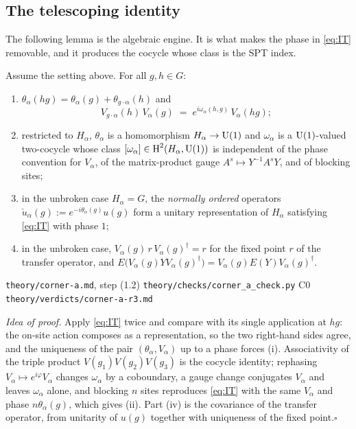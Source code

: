 \subsection{The telescoping identity}

The following lemma is the algebraic engine.  It is what makes the phase in
\cref{eq:IT} removable, and it produces the cocycle whose class is the SPT index.

\begin{lemma}
\label{thm:lemma-it}
Assume the setting above.  For all $g,h\in G$:
\begin{enumerate}
\item[(i)] $\theta_\alpha(hg)=\theta_\alpha(g)+\theta_{g\cdot\alpha}(h)$ and
  \begin{equation}
    V_{g\cdot\alpha}(h)\,V_\alpha(g) \;=\; e^{i\omega_\alpha(h,g)}\,V_\alpha(hg);
    \label{eq:cocycle}
  \end{equation}
\item[(ii)] restricted to $H_\alpha$, $\theta_\alpha$ is a homomorphism
  $H_\alpha\to \operatorname{U}(1)$ and $\omega_\alpha$ is a $\operatorname{U}(1)$-valued two-cocycle whose
  class $[\omega_\alpha]\in \operatorname{H}^2(H_\alpha,\operatorname{U}(1))$ is independent of the phase
  convention for $V_\alpha$, of the matrix-product gauge $A^s\mapsto Y^{-1}A^sY$,
  and of blocking sites;
\item[(iii)] in the unbroken case $H_\alpha=G$, the \emph{normally ordered}
  operators $\check{u}_\alpha(g):=e^{-i\theta_\alpha(g)}u(g)$ form a unitary
  representation of $H_\alpha$ satisfying \cref{eq:IT} with phase $1$;
\item[(iv)] in the unbroken case, $V_\alpha(g)\,r\,V_\alpha(g)^\dagger=r$ for the
  fixed point $r$ of the transfer operator, and
  $E\bigl(V_\alpha(g)YV_\alpha(g)^\dagger\bigr)=V_\alpha(g)E(Y)V_\alpha(g)^\dagger$.
\end{enumerate}
\end{lemma}

%
{\texttt{theory/corner-a.md}, step (1.2)}%
{\texttt{theory/checks/corner\_a\_check.py} C0}%
{\texttt{theory/verdicts/corner-a-r3.md}}

\smallskip\noindent\textit{Idea of proof.}
Apply \cref{eq:IT} twice and compare with its single application at $hg$: the
on-site action composes as a representation, so the two right-hand sides agree,
and the uniqueness of the pair $(\theta_\alpha,V_\alpha)$ up to a phase forces
(i).  Associativity of the triple product $V(g_1)V(g_2)V(g_3)$ is the cocycle
identity; rephasing $V_\alpha\mapsto e^{i\varphi}V_\alpha$ changes
$\omega_\alpha$ by a coboundary, a gauge change conjugates $V_\alpha$ and leaves
$\omega_\alpha$ alone, and blocking $n$ sites reproduces \cref{eq:IT} with the
same $V_\alpha$ and phase $n\theta_\alpha(g)$, which gives (ii).  Part (iv) is the
covariance of the transfer operator, from unitarity of $u(g)$ together with
uniqueness of the fixed point.\hfill$\square$

